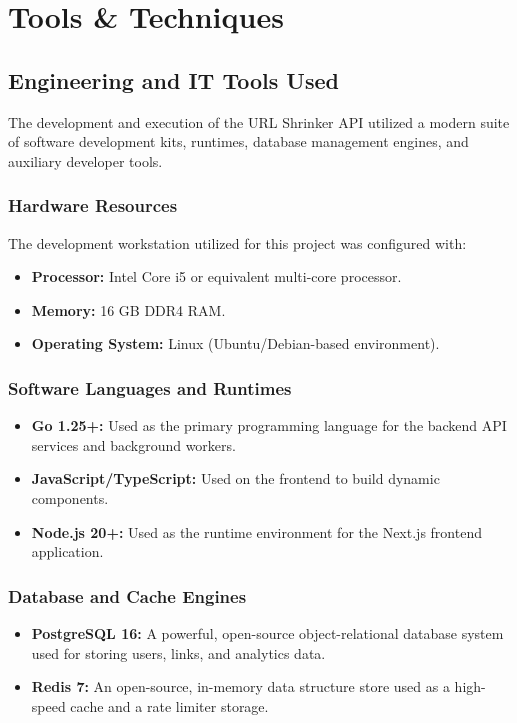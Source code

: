 \chapter{Tools \& Techniques}

\section{Engineering and IT Tools Used}
The development and execution of the URL Shrinker API utilized a modern suite of software development kits, runtimes, database management engines, and auxiliary developer tools.

\subsection{Hardware Resources}
The development workstation utilized for this project was configured with:
\begin{itemize}
    \item \textbf{Processor:} Intel Core i5 or equivalent multi-core processor.
    \item \textbf{Memory:} 16 GB DDR4 RAM.
    \item \textbf{Operating System:} Linux (Ubuntu/Debian-based environment).
\end{itemize}

\subsection{Software Languages and Runtimes}
\begin{itemize}
    \item \textbf{Go 1.25+:} Used as the primary programming language for the backend API services and background workers.
    \item \textbf{JavaScript/TypeScript:} Used on the frontend to build dynamic components.
    \item \textbf{Node.js 20+:} Used as the runtime environment for the Next.js frontend application.
\end{itemize}

\subsection{Database and Cache Engines}
\begin{itemize}
    \item \textbf{PostgreSQL 16:} A powerful, open-source object-relational database system used for storing users, links, and analytics data.
    \item \textbf{Redis 7:} An open-source, in-memory data structure store used as a high-speed cache and a rate limiter storage.
\end{itemize}

